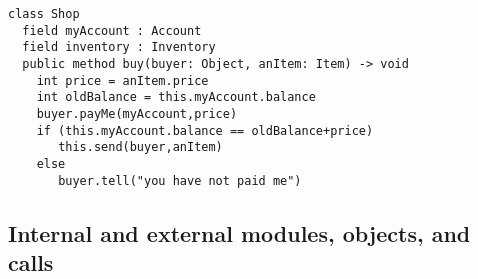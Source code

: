 %
 

\begin{lstlisting}
class Shop
  field myAccount : Account
  field inventory : Inventory    
  public method buy(buyer: Object, anItem: Item) -> void
    int price = anItem.price
    int oldBalance = this.myAccount.balance
    buyer.payMe(myAccount,price)
    if (this.myAccount.balance == oldBalance+price)
       this.send(buyer,anItem)
    else
       buyer.tell("you have not paid me")               
\end{lstlisting}
 
 
 
\subsection{Internal and external modules, objects, and calls}
\label{s:concepts}

